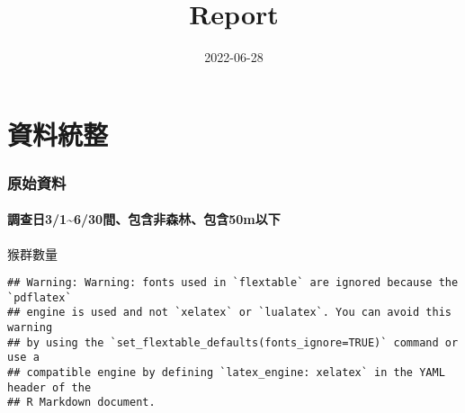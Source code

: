 \documentclass[
]{article}
\title{Report}
\author{}
\date{\vspace{-2.5em}2022-06-28}
\begin{document}
\maketitle

\hypertarget{ux8cc7ux6599ux7d71ux6574}{%
\section{資料統整}\label{ux8cc7ux6599ux7d71ux6574}}

\hypertarget{ux539fux59cbux8cc7ux6599}{%
\subsubsection{\texorpdfstring{\textbf{原始資料}}{原始資料}}\label{ux539fux59cbux8cc7ux6599}}

\hypertarget{ux8abfux67e5ux65e531630ux9593ux5305ux542bux975eux68eeux6797ux5305ux542b50mux4ee5ux4e0b}{%
\paragraph{\texorpdfstring{\textbf{調查日3/1\textasciitilde6/30間、包含非森林、包含50m以下}}{調查日3/1\textasciitilde6/30間、包含非森林、包含50m以下}}\label{ux8abfux67e5ux65e531630ux9593ux5305ux542bux975eux68eeux6797ux5305ux542b50mux4ee5ux4e0b}}

猴群數量

\begin{verbatim}
## Warning: Warning: fonts used in `flextable` are ignored because the `pdflatex`
## engine is used and not `xelatex` or `lualatex`. You can avoid this warning
## by using the `set_flextable_defaults(fonts_ignore=TRUE)` command or use a
## compatible engine by defining `latex_engine: xelatex` in the YAML header of the
## R Markdown document.
\end{verbatim}

\providecommand{\docline}[3]{\noalign{\global\setlength{\arrayrulewidth}{#1}}\arrayrulecolor[HTML]{#2}\cline{#3}}

\setlength{\tabcolsep}{2pt}

\renewcommand*{\arraystretch}{1.5}
\end{document}
